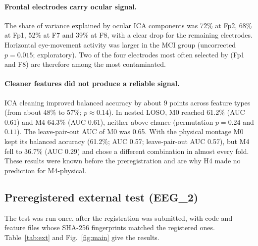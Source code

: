 \paragraph{Frontal electrodes carry ocular signal.} The share of variance explained by ocular ICA components was 72\% at Fp2, 68\% at Fp1, 52\% at F7 and 39\% at F8, with a clear drop for the remaining electrodes. Horizontal eye-movement activity was larger in the MCI group (uncorrected $p=0.015$; exploratory). Two of the four electrodes most often selected by \citet{aljalal2024} (Fp1 and F8) are therefore among the most contaminated.

\paragraph{Cleaner features did not produce a reliable signal.} ICA cleaning improved balanced accuracy by about 9 points across feature types (from about 48\% to 57\%; $p\approx0.14$). In nested LOSO, M0 reached 61.2\% (AUC 0.61) and M4 64.3\% (AUC 0.61), neither above chance (permutation $p=0.24$ and $0.11$). The leave-pair-out AUC of M0 was 0.65. With the physical montage M0 kept its balanced accuracy (61.2\%; AUC 0.57; leave-pair-out AUC 0.57), but M4 fell to 36.7\% (AUC 0.29) and chose a different combination in almost every fold. These results were known before the preregistration and are why H4 made no prediction for M4-physical.

\subsection{Preregistered external test (EEG\_2)}

The test was run once, after the registration was submitted, with code and feature files whose SHA-256 fingerprints matched the registered ones. Table~\ref{tab:ext} and Fig.~\ref{fig:main} give the results.

